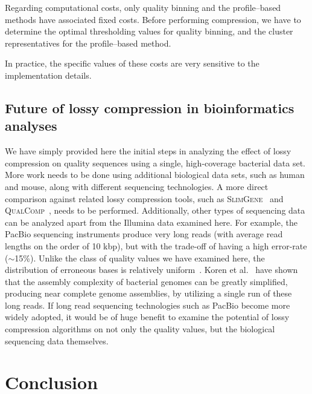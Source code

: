 \documentclass{bioinfo}
\begin{document}
Regarding computational costs, only quality binning and the profile--based methods have associated fixed costs.
Before performing compression, we have to determine the optimal thresholding values for quality binning, and the cluster representatives for the profile--based method.

In practice, the specific values of these costs are very sensitive to the implementation details.

\subsection{Future of lossy compression in bioinformatics analyses}

We have simply provided here the initial steps in analyzing the effect of lossy compression on quality sequences using a single, high-coverage bacterial data set. More work needs to be done using additional biological data sets, such as human and mouse, along with different sequencing technologies.
A more direct comparison against related lossy compression tools, such as \textsc{SlimGene}~\cite{kozanitis2011compressing} and \textsc{QualComp}~\cite{ochoa2013qualcomp}, needs to be performed. Additionally, other types of sequencing data can be analyzed apart from the Illumina data examined here. For example, the PacBio sequencing instruments produce very long reads (with average read lengths on the order of 10 kbp), but with the trade-off of having a high error-rate ($\sim$15\%).
Unlike the class of quality values we have examined here, the distribution of erroneous bases is relatively uniform~\cite{ferrarini2013evaluation}.
Koren et al.~\cite{koren2013reducing} have shown that the assembly complexity of bacterial genomes can be greatly simplified, producing near complete genome assemblies, by utilizing a single run of these long reads.
If long read sequencing technologies such as PacBio become more widely adopted, it would be of huge benefit to examine the potential of lossy compression algorithms on not only the quality values, but the biological sequencing data themselves.


%
%




\section{Conclusion}
\end{document}

